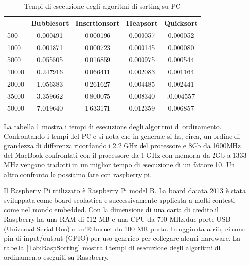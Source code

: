 \documentclass[12pt,a4paper]{report}
\begin{document}
	
	\begin{table}[h]
		\centering
		\begin{tabular}		{| l | c | c | c | c |}
		\hline
		      & Bubblesort & Insertionsort & Heapsort & Quicksort \\ \hline
500   & 0.000491      & 0.000196      & 0.000057 & 0.000052     \\ \hline
1000  & 0.001871	    & 0.000723      & 0.000145 & 0.000080     \\ \hline
5000  & 0.055505      & 0.016859     & 0.000975  & 0.000544   \\ \hline
10000 & 0.247916      & 0.066411     & 0.002083 & 0.001164     \\ \hline
20000 & 1.056383   & 0.261627      & 0.004485  & 0.002441   \\ \hline
35000 & 3.359662     & 0.800075     & 0.008340  & ;0.004557   \\ \hline
50000 & 7.019640     & 1.633171   & 0.012359  & 0.006857  \\ \hline

		\end{tabular}
		\caption{Tempi di esecuzione degli algoritmi di sorting su PC}
		\label{Fig:PcSort}
	\end{table}

La tabella \ref{Fig:PcSort} mostra i tempi di esecuzione degli algoritmi di ordinamento. Confrontando i tempi del PC e si nota che in generale si ha, circa, un ordine di grandezza di differenza ricordando i 2.2 GHz del processore e 8Gb da 1600MHz del MacBook confrontati con il processore da 1 GHz con memoria da 2Gb a 1333 MHz vengono tradotti in un miglior tempo di esecuzione di un fattore 10.
Un altro confronto lo possiamo fare con raspberry pi.

Il Raspberry Pi utilizzato è Raspberry Pi model B. La board datata 2013 è stata sviluppata come board scolastica e successivamente applicata a molti contesti come nel mondo embedded.
Con la dimensione di una carta di credito il Raspberry ha una RAM di 512 MB e una CPU da 700 MHz,due porte USB (Universal Serial Bus) e un'Ethernet da 100 MB porta. In aggiunta a ciò, ci sono pin di input/output (GPIO) per uso generico per collegare alcuni hardware.  La tabella \ref{Tab:RaspSorting} mostra i tempi di esecuzione degli algoritmi di ordinamento eseguiti su Raspberry.
\end{document}
